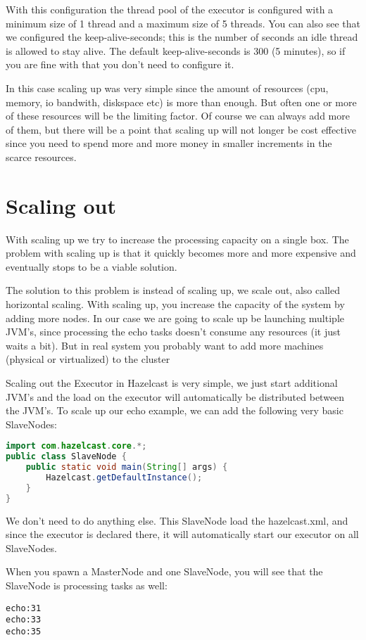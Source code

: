 With this configuration the thread pool of the executor is configured with a minimum size of 1 thread and a maximum size of 5 threads. You can also see that we configured the keep-alive-seconds; this is the number of seconds an idle thread is allowed to stay alive. The default keep-alive-seconds is 300 (5 minutes), so if you are fine with that you don't need to configure it.

In this case scaling up was very simple since the amount of resources (cpu, memory, io bandwith, diskspace etc) is more than enough. But often one or more of these resources will be the limiting factor. Of course we can always add more of them, but there will be a point that scaling up will not longer be cost effective since you need to spend more and more money in smaller increments in the scarce resources.

\section{Scaling out}
With scaling up we try to increase the processing capacity on a single box. The problem with scaling up is that it quickly becomes more and more expensive and eventually stops to be a viable solution.

The solution to this problem is instead of scaling up, we scale out, also called horizontal scaling. With scaling up, you increase the capacity of the system by adding more nodes. In our case we are going to scale up be launching multiple JVM's, since processing the echo tasks doesn't consume any resources (it just waits a bit). But in real system you probably want to add more machines (physical or virtualized) to the cluster

Scaling out the Executor in Hazelcast is very simple, we just start additional JVM's and the load on the executor will automatically be distributed between the JVM's. To scale up our echo example, we can add the following very basic SlaveNodes:
\begin{lstlisting}[language=java]
import com.hazelcast.core.*;
public class SlaveNode {
    public static void main(String[] args) {
        Hazelcast.getDefaultInstance();
    }
}
\end{lstlisting}
We don't need to do anything else. This SlaveNode load the hazelcast.xml, and since the executor is declared there, it will automatically start our executor on all SlaveNodes.

When you spawn a MasterNode and one SlaveNode, you will see that the SlaveNode is processing tasks as well:
\begin{verbatim}
echo:31
echo:33
echo:35	
\end{verbatim}


